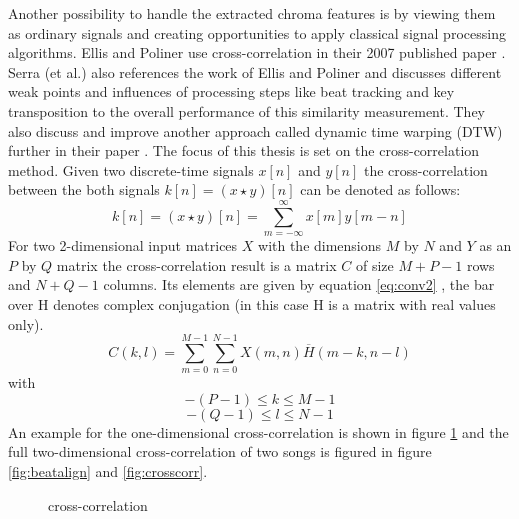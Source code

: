 Another possibility to handle the extracted chroma features is by viewing them as ordinary signals and creating opportunities to apply classical signal processing algorithms. Ellis and Poliner use cross-correlation in their 2007 published paper \cite{chroma3}. Serra (et al.) also references the work of Ellis and Poliner and discusses different weak points and influences of processing steps like beat tracking and key transposition to the overall performance of this similarity measurement. 
They also discuss and improve another approach called dynamic time warping (DTW) further in their paper \cite{chroma2}. The focus of this thesis is set on the cross-correlation method. 
Given two discrete-time signals $x[n]$ and $y[n]$ the cross-correlation between the both signals $k[n] = (x \star y)[n]$ can be denoted as follows:
\begin{equation} \label{eq:conv1}
k[n] = (x \star y)[n] = \sum_{m = -\infty}^{\infty}{x[m] y[m - n]} 
\end{equation}
For two 2-dimensional input matrices $X$ with the dimensions $M$ by $N$ and $Y$ as an $P$ by $Q$ matrix the cross-correlation result is a matrix $C$ of size $M + P - 1$ rows and $N + Q - 1$ columns. Its elements are given by equation \ref{eq:conv2} \cite{mathcorr}, the bar over H denotes complex conjugation (in this case H is a matrix with real values only).
\begin{equation} \label{eq:conv2}
C(k, l) = \sum_{m = 0}^{M - 1}{\sum_{n = 0}^{N - 1}{X(m, n)\overline{H}(m - k, n - l)}}
\end{equation}
with 
\begin{equation} \label{eq:conv3}
-(P - 1) \leq k \leq M - 1
\end{equation}
\begin{equation} \label{eq:conv4}
-(Q - 1) \leq l \leq N - 1
\end{equation}
An example for the one-dimensional cross-correlation is shown in figure \ref{fig:corr1} and the full two-dimensional cross-correlation of two songs is figured in figure \ref{fig:beatalign} and \ref{fig:crosscorr}.
\begin{figure}[htbp]
	\centering
	\caption{cross-correlation}
	\label{fig:corr1}
\end{figure}
